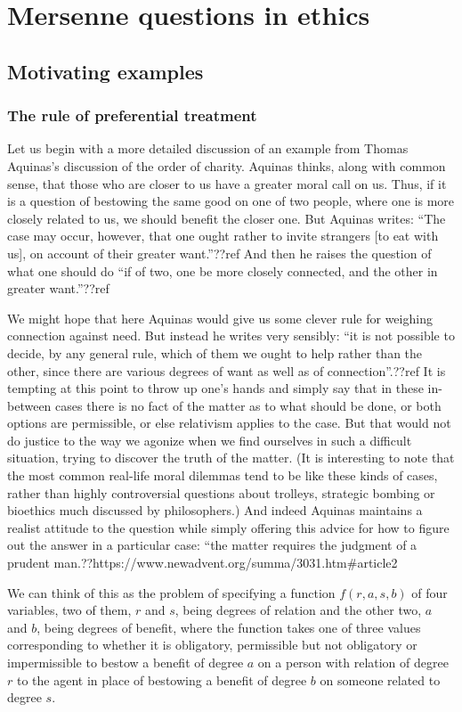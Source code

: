 \def\mychapter{II}

\chapter{Mersenne questions in ethics}\label{ch:ethics}
\section{Motivating examples}
\subsection{The rule of preferential treatment}
Let us begin with a more detailed discussion of an example from Thomas Aquinas's discussion of the order of charity. Aquinas thinks,
along with common sense, that those who are closer to us have a greater moral call on us.
Thus, if it is a question of bestowing the same good on one of two people, where one is more closely
related to us, we should benefit the closer one. But Aquinas writes: ``The case may occur, however, that one 
ought rather to invite strangers [to eat with us], on 
account of their greater want.''??ref And then he raises the question of what one should do ``if of two, one be 
more closely connected, and the other in greater want.''??ref

We might hope that here Aquinas would give us some clever rule for weighing connection against need. But 
instead he writes very sensibly: ``it is not possible to decide, by any general rule, which of them we ought 
to help rather than the other, since there are various degrees of want as well as of connection''.??ref It is
tempting at this point to throw up one's hands and simply say that in these in-between cases there is no
fact of the matter as to what should be done, or both options are permissible, or else relativism applies
to the case. But that would not do justice to the way we agonize when we find ourselves in such a difficult 
situation, trying to discover the truth of the matter. (It is interesting to note that the most common real-life moral dilemmas
tend to be like these kinds of cases, rather than highly controversial questions about trolleys, strategic bombing or
bioethics much discussed by philosophers.)
And indeed Aquinas maintains a realist attitude to
the question while simply offering this advice for how to figure out the answer in a particular case: ``the matter 
requires the judgment of a prudent man.??https://www.newadvent.org/summa/3031.htm\#article2

We can think of this as the problem of specifying a function $f(r,a,s,b)$ of four variables, two of them, $r$ and $s$, being
degrees of relation and the other two, $a$ and $b$, being degrees of benefit, where the function takes one of three values
corresponding to whether it is obligatory, permissible but not obligatory or impermissible to bestow a benefit of degree $a$ on a person with
relation of degree $r$ to the agent in place of bestowing a benefit of degree $b$ on someone related to degree $s$. 

